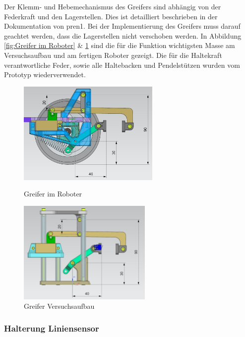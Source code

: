 Der Klemm- und Hebemechanismus des Greifers sind abhängig von der Federkraft und den Lagerstellen. Dies ist detailliert beschrieben in der Dokumentation von \acrshort{pren1}. Bei der Implementierung des Greifers muss darauf geachtet werden, dass die Lagerstellen nicht verschoben werden. In Abbildung \ref{fig:Greifer im Roboter} \& \ref{fig:Greifer Versuchsaufbau} sind die für die Funktion wichtigsten Masse am Versuchsaufbau und am fertigen Roboter gezeigt. Die für die Haltekraft verantwortliche Feder, sowie alle Haltebacken und Pendelstützen wurden vom Prototyp wiederverwendet. 

\begin{figure}[H]
  \centering
  \begin{minipage}[b]{0.45\textwidth}
    \centering
    \includegraphics[height=5cm]{assets/MT/Greifer Montiert.png}
    \caption{Greifer im Roboter}
    \label{fig:Greifer im Roboter}
  \end{minipage}
  \hfill
  \begin{minipage}[b]{0.45\textwidth}
    \centering
    \includegraphics[height=5cm]{assets/MT/Greifer Prototyp.png}
    \caption{Greifer Versuchsaufbau}
    \label{fig:Greifer Versuchsaufbau}
  \end{minipage}
\end{figure}

\newpage

\subsubsection{Halterung Liniensensor}
\label{Halterung Liniensensor}

